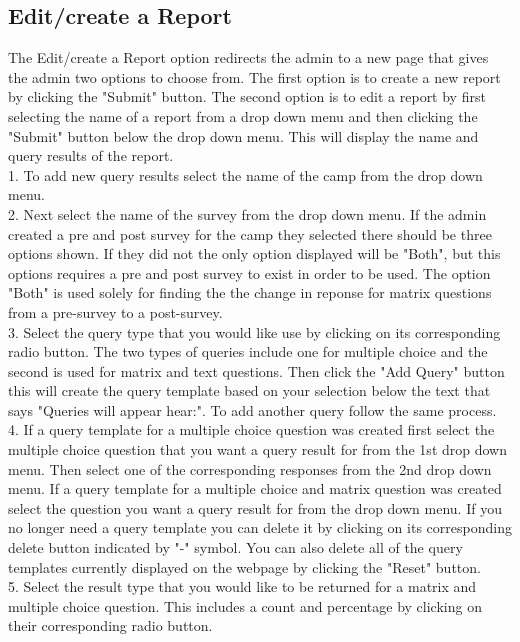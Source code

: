 \documentclass[letterpaper,10pt,serif, draftclsnofoot,onecolumn, compsoc, titlepage]{IEEEtran}
\begin{document}
\subsection{Edit/create a Report}
The Edit/create a Report option redirects the admin to a new page that gives the admin two options to choose from.
The first option is to create a new report by clicking the "Submit" button.
The second option is to edit a report by first selecting the name of a report from a drop down menu and then clicking the "Submit" button below the drop down menu.
This will display the name and query results of the report. \\
1. To add new query results select the name of the camp from the drop down menu. \\
2. Next select the name of the survey from the drop down menu.
If the admin created a pre and post survey for the camp they selected there should be three options shown.
If they did not the only option displayed will be "Both", but this options requires a pre and post survey to exist in order to be used.
The option "Both" is used solely for finding the the change in reponse for matrix questions from a pre-survey to a post-survey.\\ 
3. Select the query type that you would like use by clicking on its corresponding radio button. 
The two types of queries include one for multiple choice and the second is used for matrix and text questions.
Then click the "Add Query" button this will create the query template based on your selection below the text that says "Queries will appear hear:".
To add another query follow the same process.\\
4. If a query template for a multiple choice question was created first select the multiple choice question that you want a query result for from the 1st drop down menu.
Then select one of the corresponding responses from the 2nd drop down menu.
If a query template for a multiple choice and matrix question was created select the question you want a query result for from the drop down menu.
If you no longer need a query template you can delete it by clicking on its corresponding delete button indicated by "-" symbol.
You can also delete all of the query templates currently displayed on the webpage by clicking the "Reset" button.\\ 
5. Select the result type that you would like to be returned for a matrix and multiple choice question.
This includes a count and percentage by clicking on their corresponding radio button.\\
\end{document}
